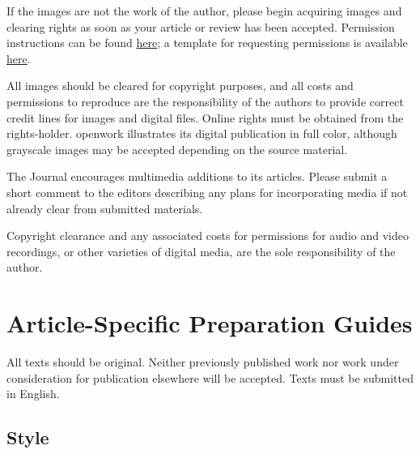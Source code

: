 \documentclass[12pt]{article}
\begin{document}
If the images are not the work of the author, please begin acquiring images and clearing rights as soon as your article or review has been accepted. Permission instructions can be found \href{https://drive.google.com/file/d/1TJF59MuoX3erJv5WXY6jg1Uh0hZzYU6N/view}{here}; a template for requesting permissions is available \href{https://drive.google.com/file/d/1MJ9yFqoR7GNSpBaNPJLexXKvkF4yifzR/view}{here}.

All images should be cleared for copyright purposes, and all costs and permissions to reproduce are the responsibility of the authors to provide correct credit lines for images and digital files. Online rights must be obtained from the rights-holder. openwork illustrates its digital publication in full color, although grayscale images may be accepted depending on the source material.

The Journal encourages multimedia additions to its articles. Please submit a short comment to the editors describing any plans for incorporating media if not already clear from submitted materials.

Copyright clearance and any associated costs for permissions for audio and video recordings, or other varieties of digital media, are the sole responsibility of the author.

\section*{Article-Specific Preparation Guides}

All texts should be original. Neither previously published work nor work under consideration for publication elsewhere will be accepted. Texts must be submitted in English.

\subsection{Style}
\end{document}
